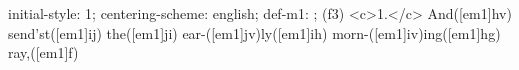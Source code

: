 initial-style: 1;
centering-scheme: english;
def-m1: \grealign;
(f3) <c>1.</c> And([em1]hv) send'st([em1]ij) the([em1]ji) ear-([em1]jv)ly([em1]ih) morn-([em1]iv)ing([em1]hg) ray,([em1]f)